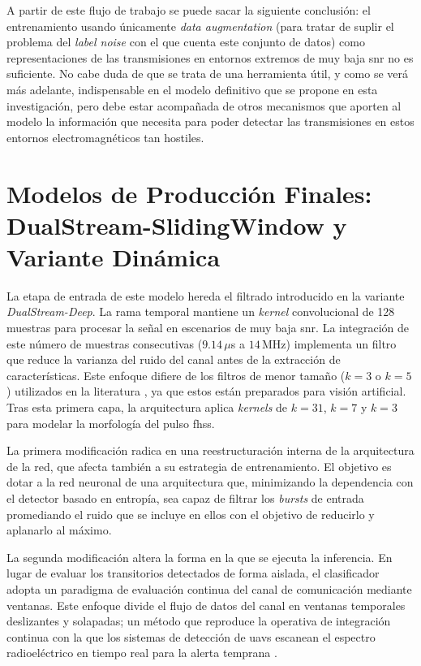 A partir de este flujo de trabajo se puede sacar la siguiente conclusión: el entrenamiento usando únicamente \textit{data augmentation} (para tratar de suplir el problema del \textit{label noise} con el que cuenta este conjunto de datos) como representaciones de las transmisiones en entornos extremos de muy baja \gls{snr} no es suficiente. No cabe duda de que se trata de una herramienta útil, y como se verá más adelante, indispensable en el modelo definitivo que se propone en esta investigación, pero debe estar acompañada de otros mecanismos que aporten al modelo la información que necesita para poder detectar las transmisiones en estos entornos electromagnéticos tan hostiles. 


\section{Modelos de Producción Finales: DualStream-SlidingWindow y Variante Dinámica}
\label{sec:dualstream_def}
La etapa de entrada de este modelo hereda el filtrado introducido en la variante \textit{DualStream-Deep}. La rama temporal mantiene un \textit{kernel} convolucional de 128 muestras para procesar la señal en escenarios de muy baja \gls{snr}. La integración de este número de muestras consecutivas ($9.14\,\mu$s a $14$\,MHz) implementa un filtro que reduce la varianza del ruido del canal antes de la extracción de características. Este enfoque difiere de los filtros de menor tamaño ($k=3$ o $k=5$) utilizados en la literatura \cite{gluge_robust_2024}, ya que estos están preparados para visión artificial. Tras esta primera capa, la arquitectura aplica \textit{kernels} de $k=31$, $k=7$ y $k=3$ para modelar la morfología del pulso \gls{fhss}.

La primera modificación radica en una reestructuración interna de la arquitectura de la red, que afecta también a su estrategia de entrenamiento. El objetivo es dotar a la red neuronal de una arquitectura que, minimizando la dependencia con el detector basado en entropía, sea capaz de filtrar los \textit{bursts} de entrada promediando el ruido que se incluye en ellos con el objetivo de reducirlo y aplanarlo al máximo.

La segunda modificación altera la forma en la que se ejecuta la inferencia. En lugar de evaluar los transitorios detectados de forma aislada, el clasificador adopta un paradigma de evaluación continua del canal de comunicación mediante ventanas. Este enfoque divide el flujo de datos del canal en ventanas temporales deslizantes y solapadas; un método que reproduce la operativa de integración continua con la que los sistemas de detección de \gls{uav}s escanean el espectro radioeléctrico en tiempo real para la alerta temprana \cite{ezuma_detection_2020, gluge_robust_2024}. 

